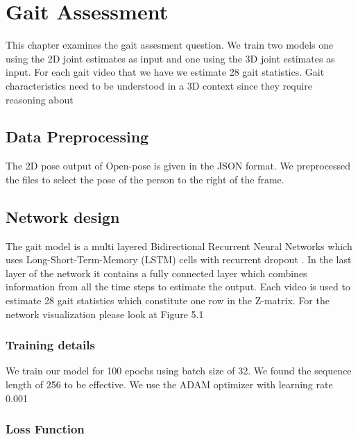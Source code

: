 
\chapter{Gait Assessment}\label{chapter:gait}

This chapter examines the gait assesment question. We train two models one using the 2D joint estimates as input and one using the 3D joint estimates as input. For each gait video that we have we estimate 28 gait statistics. Gait characteristics need to be understood in a 3D context since they require reasoning about

\section{Data Preprocessing}

The 2D pose output of Open-pose is given in the JSON format. We preprocessed the files to select the pose of the person to the right of the frame. 

\section{Network design}

The gait model is a multi layered Bidirectional Recurrent Neural Networks \parencite{schuster1997bidirectional} which uses Long-Short-Term-Memory (LSTM) \parencite{hochreiter1997long} cells with recurrent dropout \parencite{semeniuta2016recurrent}. In the last layer of the network it contains a fully connected layer which combines information from all the time steps to estimate the output. Each video is used to estimate 28 gait statistics which constitute one row in the Z-matrix. For the network visualization please look at Figure 5.1

\subsection{Training details}

We train our model for 100 epochs using batch size of 32. We found the sequence length of 256 to be effective. We use the ADAM optimizer with learning rate 0.001

\subsection{Loss Function}

